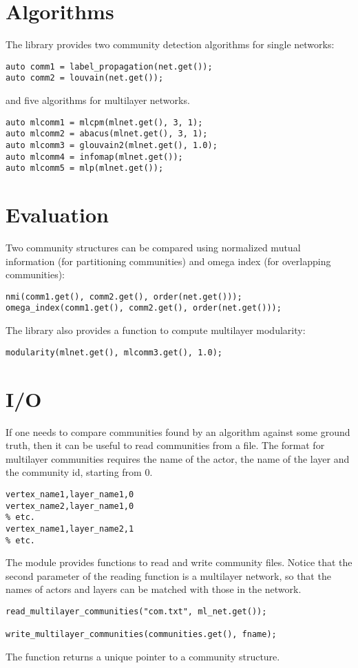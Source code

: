\section{Algorithms}

The library provides two community detection algorithms for single networks:
\begin{lstlisting}[style=c++]
auto comm1 = label_propagation(net.get());
auto comm2 = louvain(net.get());
\end{lstlisting}
    and five algorithms for multilayer networks.
\begin{lstlisting}[style=c++]
auto mlcomm1 = mlcpm(mlnet.get(), 3, 1);
auto mlcomm2 = abacus(mlnet.get(), 3, 1);
auto mlcomm3 = glouvain2(mlnet.get(), 1.0);
auto mlcomm4 = infomap(mlnet.get());
auto mlcomm5 = mlp(mlnet.get());
\end{lstlisting}
    
\section{Evaluation}

Two community structures can be compared using normalized mutual information (for partitioning communities) and omega index (for overlapping communities):
\begin{lstlisting}[style=c++]
nmi(comm1.get(), comm2.get(), order(net.get()));
omega_index(comm1.get(), comm2.get(), order(net.get()));
\end{lstlisting}

The library also provides a function to compute multilayer modularity:
\begin{lstlisting}[style=c++]
modularity(mlnet.get(), mlcomm3.get(), 1.0);
\end{lstlisting}

\section{I/O} \label{ch:community:io}

If one needs to compare communities found by an algorithm against some ground truth, then it can be useful to read communities from a file. The format for multilayer communities requires the name of the actor, the name of the layer and the community id, starting from $0$.

\begin{lstlisting}[style=file]
vertex_name1,layer_name1,0
vertex_name2,layer_name1,0
% etc.
vertex_name1,layer_name2,1
% etc.
\end{lstlisting}

The  module provides functions to read and write community files. Notice that the second parameter of the reading function is a multilayer network, so that the names of actors and layers can be matched with those in the network.
\begin{lstlisting}[style=c++]
read_multilayer_communities("com.txt", ml_net.get());

write_multilayer_communities(communities.get(), fname);
\end{lstlisting}
The  function returns a unique pointer to a community structure.